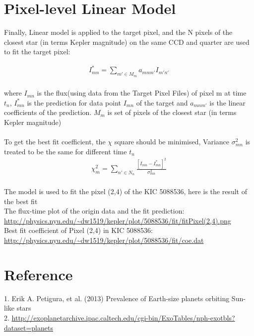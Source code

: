 \documentclass[]{article}
\begin{document}
\section{Pixel-level Linear Model}
Finally, Linear model is applied to the target pixel, and the N pixels of the closest star  (in terms Kepler magnitude) on the same CCD and quarter are used to fit the target pixel:

\begin{align*}
I_{mn}^{*}=\sum_{m' \in M_{m}} a_{mnm'}I_{m'n'}
\end{align*}
\\
where $I_{mn}$ is the flux(using data from the Target Pixel Files) of pixel m at time $t_{n}$, $I_{mn}^{*}$ is the prediction for data point $I_{mn}$ of the target and $a_{mnm'}$  is the linear coefficients of the prediction. $M_{m}$ is set of pixels of the closest star (in terms Kepler magnitude)
\\
\\
To get the best fit coefficient, the $\chi$ square should be minimised, Variance $\sigma _{mn}^{2}$ is treated to be the same for different time $t_{n}$
\begin{align*}
\chi_{m}^{2}=\sum_{n' \in N_{n}} \frac{[I_{mn}-I_{mn}^{*}]^{2}}{\sigma _{mn}^{2}}
\end{align*}
\\
The model is used to fit the pixel (2,4) of the KIC 5088536, here is the result of the best fit\\
The flux-time plot of the origin data and the fit prediction:\\
\url{http://physics.nyu.edu/~dw1519/kepler/plot/5088536/fit/fitPixel(2,4).png}\\
Best fit coefficient of Pixel (2,4) in KIC 5088536:\\
\url{http://physics.nyu.edu/~dw1519/kepler/plot/5088536/fit/coe.dat}\\

\section{Reference}
1. Erik A. Petigura, et al. (2013) Prevalence of Earth-size planets orbiting Sun-like stars\\
2. \url{http://exoplanetarchive.ipac.caltech.edu/cgi-bin/ExoTables/nph-exotbls?dataset=planets}
\end{document}
